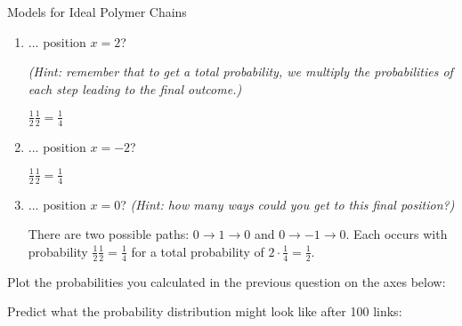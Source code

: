 \begin{activity}{Models for Ideal Polymer Chains}
\begin{ctqs}
\begin{enumerate}
			\item ... position $x=2$?
			
				\emph{(Hint: remember that to get a total probability, we \emph{multiply} the probabilities of each step leading to the final outcome.)}
				
				\begin{solution}[1in]
				
					$\frac{1}{2}\frac{1}{2} = \frac{1}{4}$
				
				\end{solution}
				
			\item ... position $x=-2$?
				
				\begin{solution}[1in]
				
					$\frac{1}{2}\frac{1}{2} = \frac{1}{4}$
					
				\end{solution}
			
			\clearpage
			\item ... position $x=0$?
				\emph{(Hint: how many ways could you get to this final position?)}
				
				\begin{solution}[1in]
				
					There are two possible paths: $0\to 1\to 0$ and $0 \to -1 \to 0$.  Each occurs with probability $\frac{1}{2}\frac{1}{2} = \frac{1}{4}$ for a total probability of $2\cdot\frac{1}{4} = \frac{1}{2}$.
				
				\end{solution}
			
		\end{enumerate}
		
	\question Plot the probabilities you calculated in the previous question on the axes below:
	
		\begin{solution}[2.25in]
		\end{solution}
	
	\question Predict what the probability distribution might look like after 100 links:
	
		\begin{solution}[2.25in]
		\end{solution}
	

\end{ctqs}
\end{activity}
